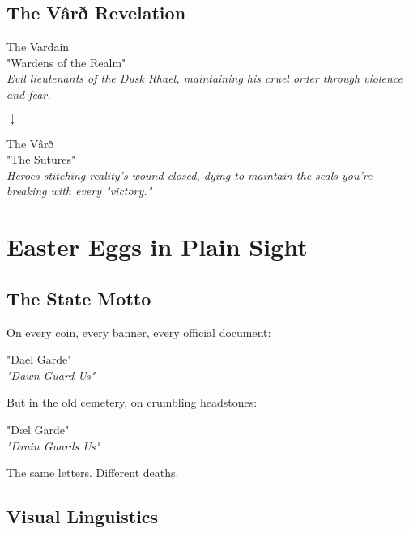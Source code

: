 \documentclass[11pt,a4paper,twoside]{book}
\begin{document}
\section{The Vârð Revelation}

\begin{adjustwidth}{2em}{2em}
\Large\displayfont
The Vardain\\
\normalfont\large
"Wardens of the Realm"\\
\normalsize
\textit{Evil lieutenants of the Dusk Rhael, maintaining his cruel order through violence and fear.}
\end{adjustwidth}

\begin{center}
$\downarrow$
\end{center}

\begin{adjustwidth}{2em}{2em}
\Large\runefont
The Vârð\\
\normalfont\large
"The Sutures"\\
\normalsize
\textit{Heroes stitching reality's wound closed, dying to maintain the seals you're breaking with every "victory."}
\end{adjustwidth}

\chapter{Easter Eggs in Plain Sight}

\section{The State Motto}

On every coin, every banner, every official document:

\begin{center}
\Huge\displayfont
"Dael Garde"\\
\normalsize\textit{"Dawn Guard Us"}
\end{center}

But in the old cemetery, on crumbling headstones:

\begin{center}
\Huge\runefont
"Dæl Garde"\\
\normalsize\textit{"Drain Guards Us"}
\end{center}

The same letters. Different deaths.

\section{Visual Linguistics}
\end{document}
